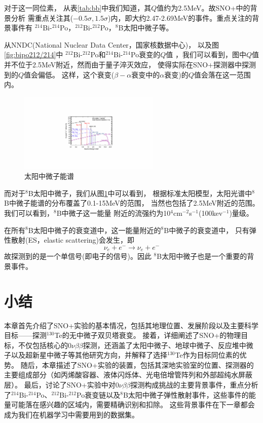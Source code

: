 对于这一同位素，
从表\ref{tab:bb}中我们知道，其$Q$值约为2.5MeV。故SNO+中的背景分析
需重点关注其($-0.5\sigma,1.5\sigma$)内，即大约2.47-2.69MeV的事件。重点关注的背景事件有
${}^{214}$Bi-${}^{214}$Po，${}^{212}$Bi-${}^{212}$Po，${}^{8}$B太阳中微子等。


从NNDC(National Nuclear Data Center，国家核数据中心)，
以及图\ref{fig:bipo212/214}中
${}^{212}$Bi-${}^{212}$Po和${}^{214}$Bi-${}^{214}$Po衰变的$Q$值
，我们可以看到，图中$Q$值并不位于2.5MeV附近，然而由于量子淬灭效应，
使得实际在SNO+探测器中探测到的$Q$值会偏低。\cite{bvkrosigk2015}
这样，这个衰变($\beta-\alpha$衰变中的$\alpha$衰变)的$Q$值会落在这一范围内。

\begin{figure}[htbp]
    \centering
    \includegraphics[width=0.6\textwidth]{figures/solarnuspec.pdf}
    \caption{太阳中微子能谱\cite{ParticleDataGroup:2024cfk}}
    \label{fig:solarnu}
\end{figure}


而对于${}^{8}$B太阳中微子，我们从图\ref{fig:solarnu}中可以看到，
根据标准太阳模型，太阳光谱中${}^{8}$B中微子能谱的分布覆盖了0.1-15MeV的范围，
当然也包括了2.5MeV附近的范围。我们可以看到，${}^{8}$B中微子这一能量
附近的流强约为10${}^4$cm$^{-2}$s$^{-1}$(100kev${}^{-1}$)量级。

在所有${}^8$B太阳中微子的衰变道中，这一能量附近的${}^8$B中微子的衰变道中，
只有弹性散射(ES，elastic scattering)会发生，即
\begin{equation}
    \nu_e + e^- \rightarrow \nu_e + e^-
\end{equation}
故探测到的是一个单信号(即电子的信号)。因此
${}^8$B太阳中微子也是一个重要的背景事件。

\section{小结}\label{summary}

本章首先介绍了SNO+实验的基本情况，包括其地理位置、发展阶段以及主要科学目标——探测${}^{130}$Te的无中微子双贝塔衰变。
接着，详细阐述了SNO+的物理目标，不仅包括核心的0$\nu\beta\beta$探测，还涵盖了太阳中微子、地球中微子、反应堆中微子以及超新星中微子等其他研究方向，并解释了选择${}^{130}$Te作为目标同位素的优势。
随后，本章描述了SNO+实验的装置，包括其深地实验室的位置、探测器的主要组成部分（如丙烯酸容器、液体闪烁体、光电倍增管阵列和外部超纯水屏蔽层）。
最后，讨论了SNO+实验中对0$\nu\beta\beta$探测构成挑战的主要背景事件，重点分析了${}^{214}$Bi-${}^{214}$Po、${}^{212}$Bi-${}^{212}$Po衰变链以及${}^{8}$B太阳中微子弹性散射事件，这些事件的能量可能落在感兴趣的区域内，需要精确识别和扣除。
这些背景事件在下一章都会成为我们在机器学习中需要用到的数据集。